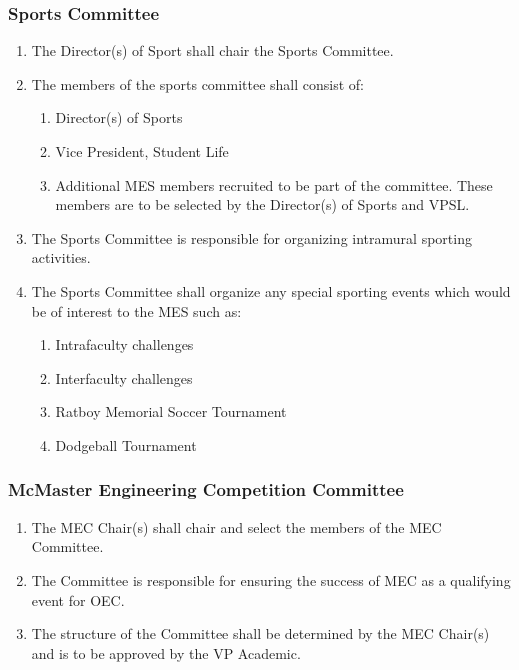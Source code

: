 \subsubsection{Sports Committee}
\label{sports-committee}
\begin{enumerate}
 \item
  The Director(s) of Sport shall chair the Sports Committee.
 \item
  The members of the sports committee shall consist of:

  \begin{enumerate}
   \item
    Director(s) of Sports
   \item
    Vice President, Student Life
   \item
    Additional MES members recruited to be part of the committee. These members are to be selected by the Director(s) of Sports and VPSL.
  \end{enumerate}
 \item
  The Sports Committee is responsible for organizing intramural sporting activities.
 \item
  The Sports Committee shall organize any special sporting events which would be of interest to the MES such as:

  \begin{enumerate}
   \item
    Intrafaculty challenges
   \item
    Interfaculty challenges
   \item
    Ratboy Memorial Soccer Tournament
   \item
    Dodgeball Tournament

  \end{enumerate}
\end{enumerate}

\subsubsection{McMaster Engineering Competition Committee}
\label{mcmaster-engineering-competition-committee}
\begin{enumerate}
 \item
  The MEC Chair(s) shall chair and select the members of the MEC Committee.
 \item
  The Committee is responsible for ensuring the success of MEC as a qualifying event for OEC.
 \item
  The structure of the Committee shall be determined by the MEC Chair(s) and is to be approved by the VP Academic.

\end{enumerate}


